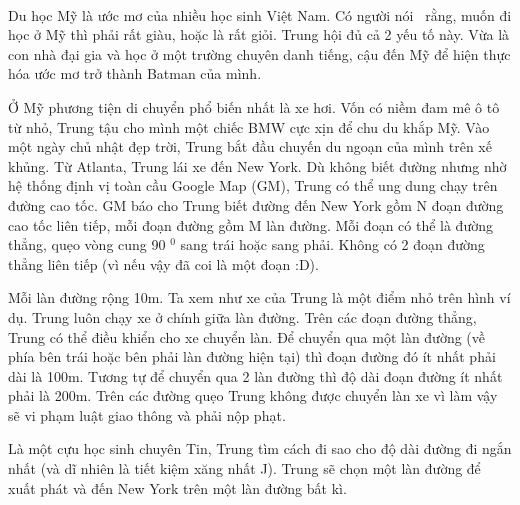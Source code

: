  

Du học Mỹ là ước mơ của nhiều học sinh Việt Nam. Có người nói  rằng, muốn đi học ở Mỹ thì phải rất giàu, hoặc là rất giỏi. Trung hội đủ cả 2 yếu tố này. Vừa là con nhà đại gia và học ở một trường chuyên danh tiếng, cậu đến Mỹ để hiện thực hóa ước mơ trở thành Batman của mình. \textbf{}

Ở Mỹ phương tiện di chuyển phổ biến nhất là xe hơi. Vốn có niềm đam mê ô tô từ nhỏ, Trung tậu cho mình một chiếc BMW cực xịn để chu du khắp Mỹ. Vào một ngày chủ nhật đẹp trời, Trung bắt đầu chuyến du ngoạn của mình trên xế khủng. Từ Atlanta, Trung lái xe đến New York. Dù không biết đường nhưng nhờ hệ thống định vị toàn cầu Google Map (GM), Trung có thể ung dung chạy trên đường cao tốc. GM báo cho Trung biết đường đến New York gồm N đoạn đường cao tốc liên tiếp, mỗi đoạn đường gồm M làn đường. Mỗi đoạn có thể là đường thẳng, quẹo vòng cung 90 $^ 0 $ sang trái hoặc sang phải. Không có 2 đoạn đường thẳng liên tiếp (vì nếu vậy đã coi là một đoạn :D).

Mỗi làn đường rộng 10m. Ta xem như xe của Trung là một điểm nhỏ trên hình ví dụ. Trung luôn chạy xe ở chính giữa làn đường. Trên các đoạn đường thẳng, Trung có thể điều khiển cho xe chuyển làn. Để chuyển qua một làn đường (về phía bên trái hoặc bên phải làn đường hiện tại) thì đoạn đường đó ít nhất phải dài là 100m. Tương tự để chuyển qua 2 làn đường thì độ dài đoạn đường ít nhất phải là 200m. Trên các đường quẹo Trung không được chuyển làn xe vì làm vậy sẽ vi phạm luật giao thông và phải nộp phạt.

Là một cựu học sinh chuyên Tin, Trung tìm cách đi sao cho độ dài đường đi ngắn nhất (và dĩ nhiên là tiết kiệm xăng nhất J). Trung sẽ chọn một làn đường để xuất phát và đến New York trên một làn đường bất kì.